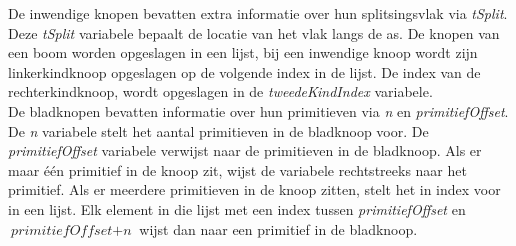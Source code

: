 De inwendige knopen bevatten extra informatie over hun splitsingsvlak via \textit{tSplit}.
Deze \textit{tSplit} variabele bepaalt de locatie van het vlak langs de as.
De knopen van een boom worden opgeslagen in een lijst, bij een inwendige knoop wordt zijn linkerkindknoop opgeslagen op de volgende index in de lijst.
De index van de rechterkindknoop, wordt opgeslagen in de \textit{tweedeKindIndex} variabele.\\

De bladknopen bevatten informatie over hun primitieven via \textit{n} en \textit{primitiefOffset}.
De \textit{n} variabele stelt het aantal primitieven in de bladknoop voor.
De \textit{primitiefOffset} variabele verwijst naar de primitieven in de bladknoop.
Als er maar één primitief in de knoop zit, wijst de variabele rechtstreeks naar het primitief.
Als er meerdere primitieven in de knoop zitten, stelt het in index voor in een lijst.
Elk element in die lijst met een index tussen \textit{primitiefOffset} en $\textit{primitiefOffset} + \textit{n}$ wijst dan naar een primitief in de bladknoop.\\

